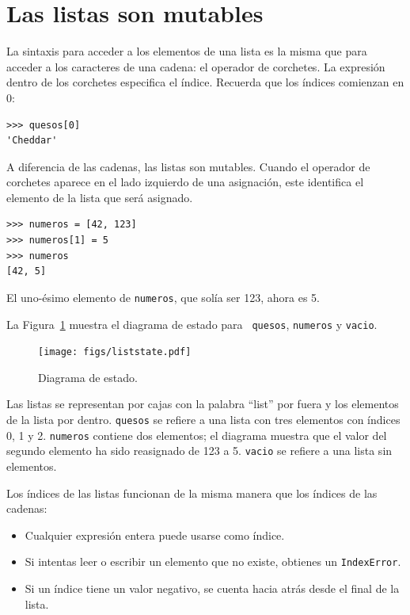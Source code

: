 \documentclass[10pt]{book}
\begin{document}
\section{Las listas son mutables}
\label{mutable}

La sintaxis para acceder a los elementos de una lista es la misma que para
acceder a los caracteres de una cadena: el operador de corchetes.  La
expresión dentro de los corchetes especifica el índice.  Recuerda que los
índices comienzan en 0:

\begin{verbatim}
>>> quesos[0]
'Cheddar'
\end{verbatim}
%
A diferencia de las cadenas, las listas son mutables.  Cuando el operador de corchetes aparece
en el lado izquierdo de una asignación, este identifica el elemento de la
lista que será asignado.

\begin{verbatim}
>>> numeros = [42, 123]
>>> numeros[1] = 5
>>> numeros
[42, 5]
\end{verbatim}
%
El uno-ésimo elemento de {\tt numeros}, que
solía ser 123, ahora es 5.

La Figura~\ref{fig.liststate} muestra
el diagrama de estado para {\tt
quesos}, {\tt numeros} y {\tt vacio}.

\begin{figure}
\centerline
{\texttt{[image: figs/liststate.pdf]}}
\caption{Diagrama de estado.}
\label{fig.liststate}
\end{figure}

Las listas se representan por cajas con la palabra ``list'' por fuera
y los elementos de la lista por dentro.  {\tt quesos} se refiere a
una lista con tres elementos con índices 0, 1 y 2.
{\tt numeros} contiene dos elementos; el diagrama muestra que el
valor del segundo elemento ha sido reasignado de 123 a 5.
{\tt vacio} se refiere a una lista sin elementos.

Los índices de las listas funcionan de la misma manera que los índices de las cadenas:

\begin{itemize}

\item Cualquier expresión entera puede usarse como índice.

\item Si intentas leer o escribir un elemento que no existe,
obtienes un {\tt IndexError}.

\item Si un índice tiene un valor negativo, se cuenta hacia atrás desde el
final de la lista.

\end{itemize}
\end{document}
